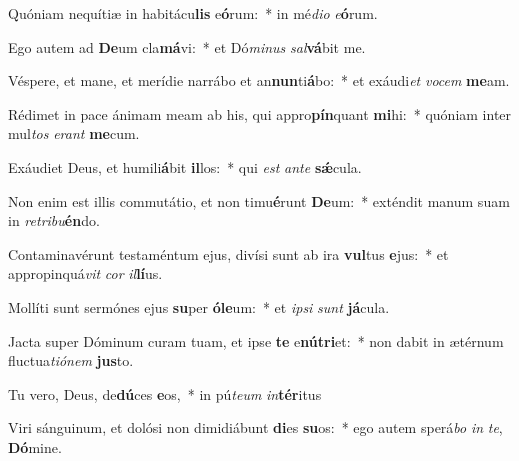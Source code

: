 \item Quóniam nequítiæ in habitácu\textbf{lis} e\textbf{ó}rum:~* in mé\textit{di}\textit{o} \textit{e}\textbf{ó}rum.
\item Ego autem ad \textbf{De}um cla\textbf{má}vi:~* et Dó\textit{mi}\textit{nus} \textit{sal}\textbf{vá}bit me.
\item Véspere, et mane, et merídie narrábo et an\textbf{nun}ti\textbf{á}bo:~* et exáudi\textit{et} \textit{vo}\textit{cem} \textbf{me}am.
\item Rédimet in pace ánimam meam ab his, qui appro\textbf{pín}quant \textbf{mi}hi:~* quóniam inter mul\textit{tos} \textit{e}\textit{rant} \textbf{me}cum.
\item Exáudiet Deus, et humili\textbf{á}bit \textbf{il}los:~* qui \textit{est} \textit{an}\textit{te} \textbf{sǽ}cula.
\item Non enim est illis commutátio, et non timu\textbf{é}runt \textbf{De}um:~* exténdit manum suam in \textit{re}\textit{tri}\textit{bu}\textbf{én}do.
\item Contaminavérunt testaméntum ejus, divísi sunt ab ira \textbf{vul}tus \textbf{e}jus:~* et appropinquá\textit{vit} \textit{cor} \textit{il}\textbf{lí}us.
\item Mollíti sunt sermónes ejus \textbf{su}per \textbf{ó}\textbf{le}um:~* et \textit{ip}\textit{si} \textit{sunt} \textbf{já}cula.
\item Jacta super Dóminum curam tuam, et ipse \textbf{te} e\textbf{nú}\textbf{tri}et:~* non dabit in ætérnum fluctua\textit{ti}\textit{ó}\textit{nem} \textbf{jus}to.
\item Tu vero, Deus, de\textbf{dú}ces \textbf{e}os,~* in pú\textit{te}\textit{um} \textit{in}\textbf{tér}itus
\item Viri sánguinum, et dolósi non dimidiábunt \textbf{di}es \textbf{su}os:~* ego autem sperá\textit{bo} \textit{in} \textit{te}, \textbf{Dó}mine.
